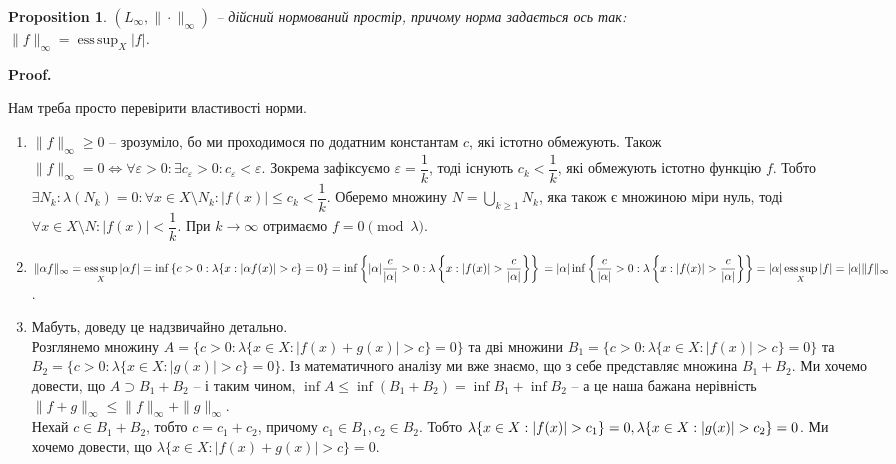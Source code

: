 \documentclass[a4paper, 10pt]{article}
\makeatletter
\theoremstyle{theoremdd}
\newtheorem{proposition}[theorem]{Proposition}
\DeclareMathOperator*{\esssup}{ess\,sup}
\renewenvironment{proof}[1][Proof.\\]{\par
\pushQED{\hfill \qed}%
\normalfont \topsep6\p@\@plus6\p@\relax
\trivlist
\item\relax
{\bfseries
#1\@addpunct{.}}\hspace\labelsep\ignorespaces
}{%
\popQED\endtrivlist\@endpefalse
}
\makeatother
\begin{document}
\begin{proposition}
$(L_\infty, \| \cdot \|_\infty)$ -- дійсний нормований простір, причому норма задається ось так:\\
$\displaystyle\|f\|_\infty = \esssup_X |f|$.
\end{proposition}

\begin{proof}
Нам треба просто перевірити властивості норми.
\begin{enumerate}[nosep,wide=0pt,label={\arabic*)}]
\item $\|f\|_\infty \geq 0$ -- зрозуміло, бо ми проходимося по додатним константам $c$, які істотно обмежують. Також $\|f\|_\infty = 0 \iff \forall \varepsilon > 0: \exists c_\varepsilon > 0: c_\varepsilon < \varepsilon$. Зокрема зафіксуємо $\varepsilon = \dfrac{1}{k}$, тоді існують $c_k < \dfrac{1}{k}$, які обмежують істотно функцію $f$. Тобто $\exists N_k: \lambda(N_k) = 0: \forall x \in X \setminus N_k: |f(x)| \leq c_k < \dfrac{1}{k}$. Оберемо множину $N = \displaystyle\bigcup_{k \geq 1} N_k$, яка також є множиною міри нуль, тоді $\forall x \in X \setminus N: |f(x)| < \dfrac{1}{k}$. При $k \to \infty$ отримаємо $f = 0 \pmod \lambda$.\\ 
\item $\|\alpha f\|_\infty = \displaystyle \esssup_X |\alpha f| = \inf \left\{ c > 0: \lambda \{x: |\alpha f(x)| > c \} = 0 \right\} = \inf \left\{ |\alpha| \dfrac{c}{|\alpha|} > 0 : \lambda \left\{ x: |f(x)| > \dfrac{c}{|\alpha|} \right\} \right\} \\ = |\alpha| \inf \left\{ \dfrac{c}{|\alpha|} > 0 : \lambda \left\{ x: |f(x)| > \dfrac{c}{|\alpha|} \right\} \right\} = |\alpha| \esssup_X |f| = |\alpha| \|f\|_\infty$.\\
\item Мабуть, доведу це надзвичайно детально.\\
Розглянемо множину $A = \{c > 0: \lambda\{x \in X: |f(x)+g(x)| > c\} = 0\}$ та дві множини $B_1 = \{c > 0: \lambda \{x \in X: |f(x)| > c\} = 0\}$ та $B_2 = \{c > 0: \lambda \{x \in X: |g(x)| > c\} = 0\}$. Із математичного аналізу ми вже знаємо, що з себе представляє множина $B_1 + B_2$. Ми хочемо довести, що $A \supset B_1 + B_2$ -- і таким чином, $\inf A \leq \inf (B_1 + B_2) = \inf B_1 + \inf B_2$ -- а це наша бажана нерівність $\|f+g\|_{\infty} \leq \|f\|_\infty + \|g\|_\infty$.\\
Нехай $c \in B_1+B_2$, тобто $c = c_1 + c_2$, причому $c_1 \in B_1,c_2 \in B_2$. Тобто $\lambda\{x \in X: |f(x)| > c_1\} = 0,\ \\ \lambda\{x \in X: |g(x)| > c_2\} = 0$. Ми хочемо довести, що $\lambda \{x \in X: |f(x)+g(x)| > c\} = 0$.\\

\end{enumerate}
\end{proof}
\end{document}
